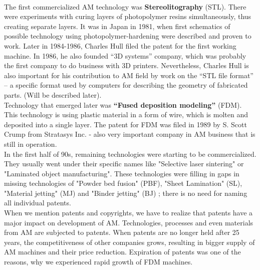 \documentclass[a4paper, twoside, 11pt]{report}
\begin{document}
%
\\
The first commercialized AM technology was \textbf{Stereolitography} (STL). There were experiments with curing layers of photopolymer resins simultaneously, thus creating separate layers. It was in Japan in 1981, when first schematics of possible technology using photopolymer-hardening were described and proven to work. Later in 1984-1986, Charles Hull filed the patent for the first working machine.\cite{FirstPatent}
In 1986, he also founded “3D systems” company, which was probably the first company to do business with 3D printers. Nevertheless, Charles Hull is also important for his contribution to AM field by work on the “STL file format” – a specific format used by computers for describing the geometry of fabricated parts. (Will be described later).\\
Technology that emerged later was \textbf{“Fused deposition modeling”} (FDM). This technology is using plastic material in a form of wire, which is molten and deposited into a single layer. The patent for FDM was filed in 1989 by S. Scott Crump from Stratasys Inc.  - also very important company in AM business that is still in operation.\\
In the first half of 90s, remaining technologies were starting to be commercialized. They usually went under their specific names like "Selective laser sintering" or  "Laminated object manufacturing". These technologies were filling in gaps in missing technologies of "Powder bed fusion" (PBF), "Sheet Lamination" (SL), "Material jetting" (MJ) and "Binder jetting" (BJ) ; there is no need for naming all individual patents.\\
When we mention patents and copyrights, we have to realize that patents have a major impact on development of AM. Technologies, processes and even materials from AM are subjected to patents. When patents are no longer held after 25 years, the competitiveness of other companies grows, resulting in bigger supply of AM machines and their price reduction. Expiration of patents was one of the reasons, why we experienced rapid growth of FDM machines.
\end{document}
